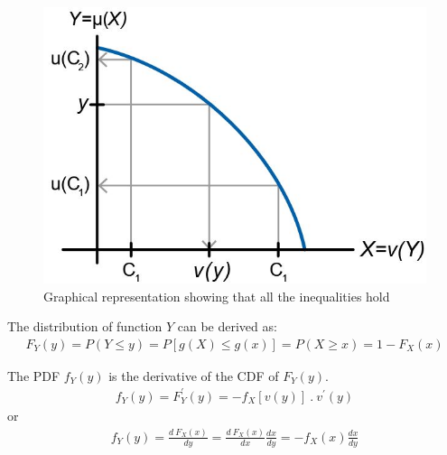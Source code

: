 \documentclass[10pt,a4paper]{article}
\begin{document}
\begin{figure} [h!]
    \centering
    \includegraphics[scale=0.5]{CoVde.JPG}
    \caption{Graphical representation showing that all the inequalities hold}
\end{figure}

The distribution of function $Y$ can be derived as:
\begin{align*}
    F_Y(y) = P(Y\leq y) = P[g(X) \leq g(x)] = P(X\geq x) = 1 - F_X (x)
\end{align*}

\begin{tcolorbox}[breakable,colback=white] 
    The PDF $f_Y(y)$ is the derivative of the CDF of $F_Y(y)$. 
    \begin{align*}
        f_Y(y) = F^\prime_Y (y) = -f_X[v(y)]\: . \: v^\prime(y)
    \end{align*}
    or 
    \begin{align*}
        f_Y(y) = \frac{d\: F_X(x)}{dy} = \frac{d\: F_X (x)}{dx} \frac{dx}{dy} = - f_X(x)\frac{dx}{dy}
    \end{align*}
\end{tcolorbox}

\end{document}
